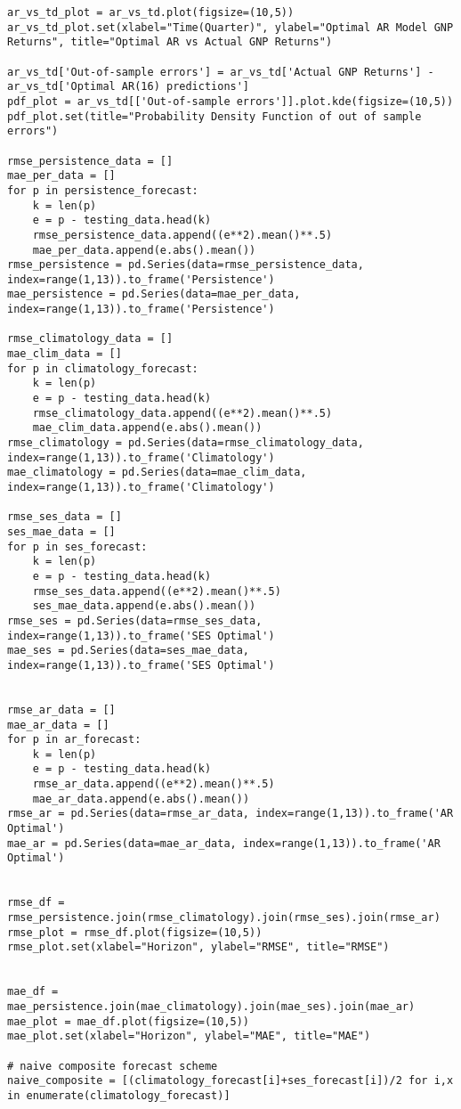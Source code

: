\documentclass{article}
\begin{document}
\begin{lstlisting}
ar_vs_td_plot = ar_vs_td.plot(figsize=(10,5))
ar_vs_td_plot.set(xlabel="Time(Quarter)", ylabel="Optimal AR Model GNP Returns", title="Optimal AR vs Actual GNP Returns")

ar_vs_td['Out-of-sample errors'] = ar_vs_td['Actual GNP Returns'] - ar_vs_td['Optimal AR(16) predictions']
pdf_plot = ar_vs_td[['Out-of-sample errors']].plot.kde(figsize=(10,5))
pdf_plot.set(title="Probability Density Function of out of sample errors")

rmse_persistence_data = []
mae_per_data = []
for p in persistence_forecast:
	k = len(p)
	e = p - testing_data.head(k)
	rmse_persistence_data.append((e**2).mean()**.5)
	mae_per_data.append(e.abs().mean())
rmse_persistence = pd.Series(data=rmse_persistence_data, index=range(1,13)).to_frame('Persistence')
mae_persistence = pd.Series(data=mae_per_data, index=range(1,13)).to_frame('Persistence')

rmse_climatology_data = []
mae_clim_data = []
for p in climatology_forecast:
	k = len(p)
	e = p - testing_data.head(k)
	rmse_climatology_data.append((e**2).mean()**.5)
	mae_clim_data.append(e.abs().mean())
rmse_climatology = pd.Series(data=rmse_climatology_data, index=range(1,13)).to_frame('Climatology')
mae_climatology = pd.Series(data=mae_clim_data, index=range(1,13)).to_frame('Climatology')

rmse_ses_data = []
ses_mae_data = []
for p in ses_forecast:
	k = len(p)
	e = p - testing_data.head(k)
	rmse_ses_data.append((e**2).mean()**.5)
	ses_mae_data.append(e.abs().mean())
rmse_ses = pd.Series(data=rmse_ses_data, index=range(1,13)).to_frame('SES Optimal')
mae_ses = pd.Series(data=ses_mae_data, index=range(1,13)).to_frame('SES Optimal')


rmse_ar_data = []
mae_ar_data = []
for p in ar_forecast:
	k = len(p)
	e = p - testing_data.head(k)
	rmse_ar_data.append((e**2).mean()**.5)
	mae_ar_data.append(e.abs().mean())
rmse_ar = pd.Series(data=rmse_ar_data, index=range(1,13)).to_frame('AR Optimal')
mae_ar = pd.Series(data=mae_ar_data, index=range(1,13)).to_frame('AR Optimal')


rmse_df = rmse_persistence.join(rmse_climatology).join(rmse_ses).join(rmse_ar)
rmse_plot = rmse_df.plot(figsize=(10,5))
rmse_plot.set(xlabel="Horizon", ylabel="RMSE", title="RMSE")


mae_df = mae_persistence.join(mae_climatology).join(mae_ses).join(mae_ar)
mae_plot = mae_df.plot(figsize=(10,5))
mae_plot.set(xlabel="Horizon", ylabel="MAE", title="MAE")

# naive composite forecast scheme
naive_composite = [(climatology_forecast[i]+ses_forecast[i])/2 for i,x in enumerate(climatology_forecast)]


\end{lstlisting}
\end{document}
